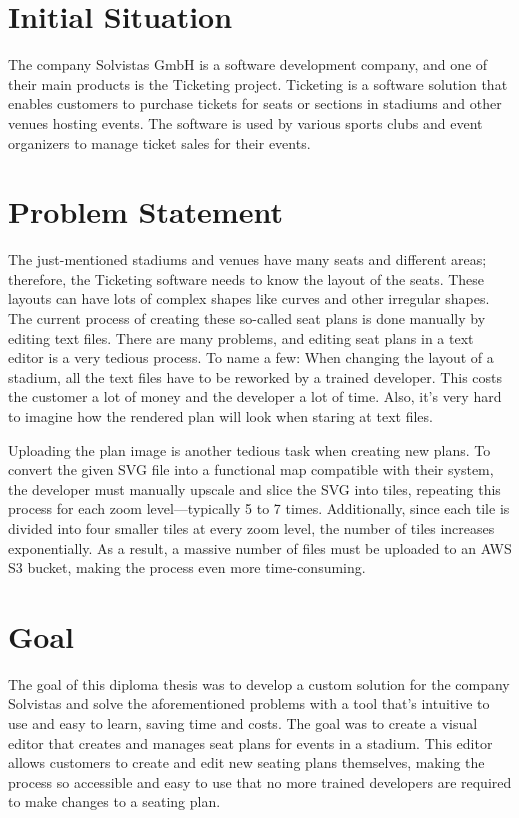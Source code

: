 \section{Initial Situation}
The company Solvistas GmbH is a software development company, and one of their main products is the Ticketing project. Ticketing is a software solution that enables customers to purchase tickets for seats or sections in stadiums and other venues hosting events. The software is used by various sports clubs and event organizers to manage ticket sales for their events.


\section{Problem Statement}
The just-mentioned stadiums and venues have many seats and different areas; therefore, the Ticketing software needs to know the layout of the seats. These layouts can have lots of complex shapes like curves and other irregular shapes. The current process of creating these so-called seat plans is done manually by editing text files. There are many problems, and editing seat plans in a text editor is a very tedious process. To name a few: When changing the layout of a stadium, all the text files have to be reworked by a trained developer. This costs the customer a lot of money and the developer a lot of time. Also, it's very hard to imagine how the rendered plan will look when staring at text files.

Uploading the plan image is another tedious task when creating new plans. To convert the given SVG file into a functional map compatible with their system, the developer must manually upscale and slice the SVG into tiles, repeating this process for each zoom level—typically 5 to 7 times. Additionally, since each tile is divided into four smaller tiles at every zoom level, the number of tiles increases exponentially. As a result, a massive number of files must be uploaded to an AWS S3 bucket, making the process even more time-consuming.

\section{Goal}
The goal of this diploma thesis was to develop a custom solution for the company Solvistas and solve the aforementioned problems with a tool that's intuitive to use and easy to learn, saving time and costs. The goal was to create a visual editor that creates and manages seat plans for events in a stadium. This editor allows customers to create and edit new seating plans themselves, making the process so accessible and easy to use that no more trained developers are required to make changes to a seating plan.